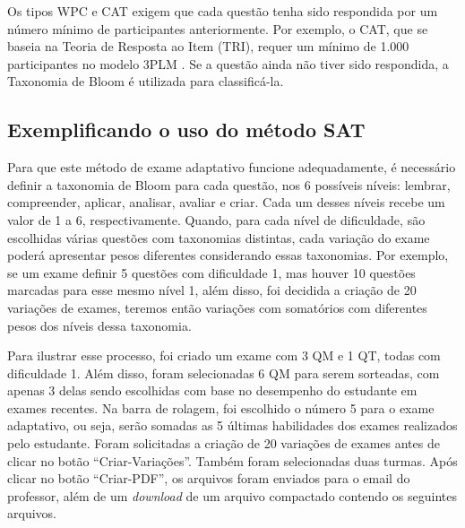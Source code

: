 Os tipos WPC e CAT exigem que cada questão tenha sido respondida por um número mínimo de participantes anteriormente. Por exemplo, o CAT, que se baseia na Teoria de Resposta ao Item (TRI), requer um mínimo de 1.000 participantes no modelo 3PLM \cite{min2021systematic}. Se a questão ainda não tiver sido respondida, a Taxonomia de Bloom é utilizada para classificá-la.


\subsection*{Exemplificando o uso do método SAT}

Para que este método de exame adaptativo funcione adequadamente, é necessário definir a taxonomia de Bloom para cada questão, nos 6 possíveis níveis: lembrar, compreender, aplicar, analisar, avaliar e criar. Cada um desses níveis recebe um valor de 1 a 6, respectivamente. Quando, para cada nível de dificuldade, são escolhidas várias questões com taxonomias distintas, cada variação do exame poderá apresentar pesos diferentes considerando essas taxonomias. Por exemplo, se um exame definir 5 questões com dificuldade 1, mas houver 10 questões marcadas para esse mesmo nível 1, além disso, foi decidida a criação de 20 variações de exames, teremos então variações com somatórios com diferentes pesos dos níveis dessa taxonomia.

Para ilustrar esse processo, foi criado um exame com 3 QM e 1 QT, todas com dificuldade 1. Além disso, foram selecionadas 6 QM para serem sorteadas, com apenas 3 delas sendo escolhidas com base no desempenho do estudante em exames recentes. Na barra de rolagem, foi escolhido o número 5 para o exame adaptativo, ou seja, serão somadas as 5 últimas habilidades dos exames realizados pelo estudante. Foram solicitadas a criação de 20 variações de exames antes de clicar no botão ``Criar-Variações''. Também foram selecionadas duas turmas. Após clicar no botão ``Criar-PDF'', os arquivos foram enviados para o email do professor, além de um \textit{download} de um arquivo compactado contendo os seguintes arquivos.

